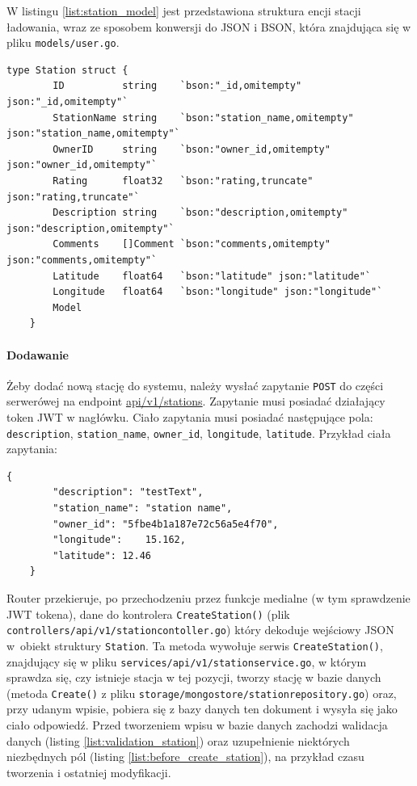 W listingu \ref{list:station_model} jest przedstawiona struktura encji stacji ładowania, wraz ze sposobem konwersji do JSON i BSON, która znajdująca się w pliku \texttt{models/user.go}.
\begin{lstlisting}[label=list:station_model,caption=Model danych stacji ładowania,basicstyle=\tiny\ttfamily]
    type Station struct {
        ID          string    `bson:"_id,omitempty" json:"_id,omitempty"`
        StationName string    `bson:"station_name,omitempty" json:"station_name,omitempty"`
        OwnerID     string    `bson:"owner_id,omitempty" json:"owner_id,omitempty"`
        Rating      float32   `bson:"rating,truncate" json:"rating,truncate"`
        Description string    `bson:"description,omitempty" json:"description,omitempty"`
        Comments    []Comment `bson:"comments,omitempty" json:"comments,omitempty"`
        Latitude    float64   `bson:"latitude" json:"latitude"`
        Longitude   float64   `bson:"longitude" json:"longitude"`
        Model
    }
\end{lstlisting}

\paragraph{Dodawanie\newline}
Żeby dodać nową stację do systemu, należy wysłać zapytanie \texttt{POST} do części serwerówej na endpoint \url{api/v1/stations}. Zapytanie musi posiadać działający token JWT w nagłówku. Ciało zapytania musi posiadać następujące pola: \texttt{description}, \texttt{station\_name}, \texttt{owner\_id}, \texttt{longitude}, \texttt{latitude}.
Przykład ciała zapytania:
\begin{lstlisting}[basicstyle=\tiny\ttfamily]
    {
		"description": "testText",
		"station_name": "station name",
		"owner_id": "5fbe4b1a187e72c56a5e4f70",
		"longitude":    15.162,
		"latitude": 12.46
    }
\end{lstlisting}

Router przekieruje, po przechodzeniu przez funkcje medialne (w tym sprawdzenie JWT tokena), dane do kontrolera \texttt{CreateStation()} (plik \texttt{controllers/api/v1/stationcontoller.go}) który dekoduje wejściowy JSON w~obiekt struktury \texttt{Station}.
Ta metoda wywołuje serwis \texttt{CreateStation()}, znajdujący się w pliku \texttt{services/api/v1/stationservice.go}, w którym sprawdza się, czy istnieje stacja w tej pozycji, tworzy stację w bazie danych (metoda \texttt{Create()} z pliku \texttt{storage/mongostore/stationrepository.go}) oraz, przy udanym wpisie, pobiera się z bazy danych ten dokument i wysyła się jako ciało odpowiedź.
Przed tworzeniem wpisu w bazie danych zachodzi walidacja danych (listing \ref{list:validation_station}) oraz uzupełnienie niektórych niezbędnych pól (listing \ref{list:before_create_station}), na przykład czasu tworzenia i ostatniej modyfikacji.

